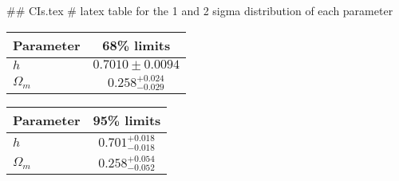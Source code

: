 ## CIs.tex
# latex table for the 1 and 2 sigma distribution of each parameter

\begin{tabular} { l  c}
 Parameter &  68\% limits\\
\hline
{\boldmath$h              $} & $0.7010\pm 0.0094          $\\
{\boldmath$\Omega_m       $} & $0.258^{+0.024}_{-0.029}   $\\
\hline
\end{tabular}

\begin{tabular} { l  c}
 Parameter &  95\% limits\\
\hline
{\boldmath$h              $} & $0.701^{+0.018}_{-0.018}   $\\
{\boldmath$\Omega_m       $} & $0.258^{+0.054}_{-0.052}   $\\
\hline
\end{tabular}
